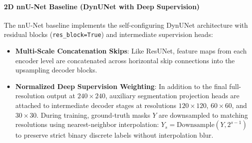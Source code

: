 \documentclass{article}
\begin{document}
\paragraph{2D nnU-Net Baseline (DynUNet with Deep Supervision)}
The nnU-Net baseline implements the self-configuring DynUNet architecture \citep{isensee2021nnunet} with residual blocks (\texttt{res\_block=True}) and intermediate supervision heads:
\begin{itemize}
    \item \textbf{Multi-Scale Concatenation Skips}: Like ResUNet, feature maps from each encoder level are concatenated across horizontal skip connections into the upsampling decoder blocks.
    \item \textbf{Normalized Deep Supervision Weighting}: In addition to the final full-resolution output at $240 \times 240$, auxiliary segmentation projection heads are attached to intermediate decoder stages at resolutions $120 \times 120$, $60 \times 60$, and $30 \times 30$. During training, ground-truth masks $Y$ are downsampled to matching resolutions using nearest-neighbor interpolation: $Y_s = \text{Downsample}(Y, 2^{s-1})$ to preserve strict binary discrete labels without interpolation blur.
    

\end{itemize}
\end{document}
